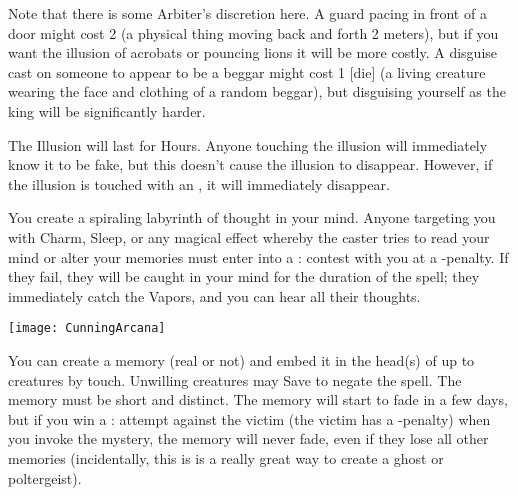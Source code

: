 {Note that there is some Arbiter's discretion here.  A guard pacing in front of a door might cost 2 \DICE (a physical thing moving back and forth 2
meters), but if you want the illusion of acrobats or pouncing lions it will be more costly.  A disguise cast on someone to appear to be a beggar might
cost 1 [die] (a living creature wearing the face and clothing of a random beggar), but disguising yourself as the king will be significantly harder.

The Illusion will last for \DICE Hours.  Anyone touching the illusion will immediately know it to be fake, but this doesn't cause the illusion to
disappear.  However, if the illusion is touched with an , it will immediately disappear.

\MYSTERY [
  Name = Labyrinth,
  Link = arcana-mystery-labyrinth,
  Paradigm = Mind,
  Save = N,
  Duration = Combat or \SUM Minutes,
  Target = Self
]

You create a spiraling labyrinth of thought in your mind.  Anyone targeting you with Charm, Sleep, or any magical effect whereby the caster tries to read your mind or alter your memories must enter into a \RB : \FOC contest with you at a -\DICE penalty.  If they fail, they will be caught in your mind for the duration of the spell;  they immediately catch the Vapors, and you can hear all their thoughts.

  \begin{center}
  \texttt{[image: CunningArcana]}
  \end{center}



\MYSTERY [
  Name = Memory Lane,
  Link = arcana-mystery-memory-lane,
  Paradigm = Mind,
  Save = Y (neg.),
  Duration = Varies,
  Target = Close Target(s)
]

You can create a memory (real or not) and embed it in the head(s) of up to \DICE creatures by touch.  Unwilling creatures may Save to negate the spell.  The memory must be short and distinct.  The memory will start to fade in a few days, but if you win a \RB : \FOC attempt against the victim (the victim has a -\DICE penalty) when you invoke the mystery, the memory will never fade, even if they lose all other memories (incidentally, this is is a really great way to create a ghost or poltergeist).

\MYSTERY [
  Name = Mirror Image,
  Link = arcana-mystery-mirror-image,
  Paradigm = Mind,
  Save = n/a,
  Duration = Minutes,
  Target = Self
]

}
